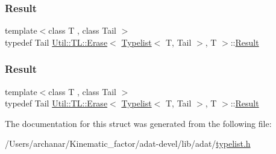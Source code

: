 \mbox{\label{structUtil_1_1TL_1_1Erase_3_01Typelist_3_01T_00_01Tail_01_4_00_01T_01_4_a847c2a353c4f86e0785cca222a67564e}} 
\subsubsection{\texorpdfstring{Result}{Result}\hspace{0.1cm}{\footnotesize\ttfamily [2/3]}}
{\footnotesize\ttfamily template$<$class T , class Tail $>$ \\
typedef Tail \mbox{\hyperlink{structUtil_1_1TL_1_1Erase}{Util\+::\+T\+L\+::\+Erase}}$<$ \mbox{\hyperlink{structUtil_1_1Typelist}{Typelist}}$<$ T, Tail $>$, T $>$\+::\mbox{\hyperlink{structUtil_1_1TL_1_1Erase_3_01Typelist_3_01T_00_01Tail_01_4_00_01T_01_4_a847c2a353c4f86e0785cca222a67564e}{Result}}}

\mbox{\label{structUtil_1_1TL_1_1Erase_3_01Typelist_3_01T_00_01Tail_01_4_00_01T_01_4_a847c2a353c4f86e0785cca222a67564e}} 
\subsubsection{\texorpdfstring{Result}{Result}\hspace{0.1cm}{\footnotesize\ttfamily [3/3]}}
{\footnotesize\ttfamily template$<$class T , class Tail $>$ \\
typedef Tail \mbox{\hyperlink{structUtil_1_1TL_1_1Erase}{Util\+::\+T\+L\+::\+Erase}}$<$ \mbox{\hyperlink{structUtil_1_1Typelist}{Typelist}}$<$ T, Tail $>$, T $>$\+::\mbox{\hyperlink{structUtil_1_1TL_1_1Erase_3_01Typelist_3_01T_00_01Tail_01_4_00_01T_01_4_a847c2a353c4f86e0785cca222a67564e}{Result}}}



The documentation for this struct was generated from the following file\+:\begin{DoxyCompactItemize}
\item 
/\+Users/archanar/\+Kinematic\+\_\+factor/adat-\/devel/lib/adat/\mbox{\hyperlink{adat-devel_2lib_2adat_2typelist_8h}{typelist.\+h}}\end{DoxyCompactItemize}

